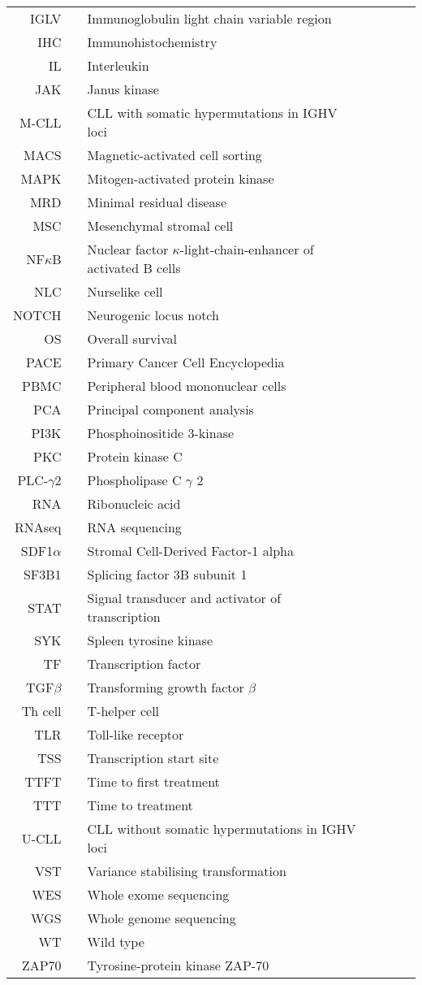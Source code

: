 \documentclass[11pt, a4paper, twosided]{book}
\begin{document}
\newpage   
\begin{tabular}{rp{0.2cm}lp{1cm}rp{0.2cm}l}
  IGLV & & Immunoglobulin light chain variable region \\
    IHC & & Immunohistochemistry \\
    IL & & Interleukin \\
    JAK & & Janus kinase \\
    M-CLL & & CLL with somatic hypermutations in IGHV loci \\
    MACS & & Magnetic-activated cell sorting \\
    MAPK & & Mitogen-activated protein kinase  \\
    MRD & & Minimal residual disease  \\
    MSC & & Mesenchymal stromal cell  \\
    NF$\kappa$B & & Nuclear factor $\kappa$-light-chain-enhancer of activated B cells \\
    NLC & & Nurselike cell  \\
    NOTCH & & Neurogenic locus notch  \\
    OS & & Overall survival \\
    PACE & & Primary Cancer Cell Encyclopedia  \\
    PBMC & & Peripheral blood mononuclear cells \\
    PCA & & Principal component analysis \\
    PI3K & & Phosphoinositide 3-kinase \\
    PKC & & Protein kinase C \\
    PLC-$\gamma$2 & & Phospholipase C $\gamma$ 2 \\
    RNA & & Ribonucleic acid  \\
    RNAseq & & RNA sequencing \\
    SDF1$\alpha$ & & Stromal Cell-Derived Factor-1 alpha  \\
    SF3B1 & & Splicing factor 3B subunit 1 \\
    STAT & & Signal transducer and activator of transcription \\
    SYK & & Spleen tyrosine kinase \\
    TF & & Transcription factor \\
    TGF$\beta$ & & Transforming growth factor $\beta$ \\
    Th cell & & T-helper cell \\
    TLR & & Toll-like receptor \\ 
    TSS & & Transcription start site \\
    TTFT & & Time to first treatment \\
    TTT & & Time to treatment \\
    U-CLL & & CLL without somatic hypermutations in IGHV loci \\
    VST & & Variance stabilising transformation \\
    WES & & Whole exome sequencing \\
    WGS & & Whole genome sequencing \\
    WT & & Wild type \\
    ZAP70 & & Tyrosine-protein kinase ZAP-70 \\
    
\end{tabular}
\end{document}
